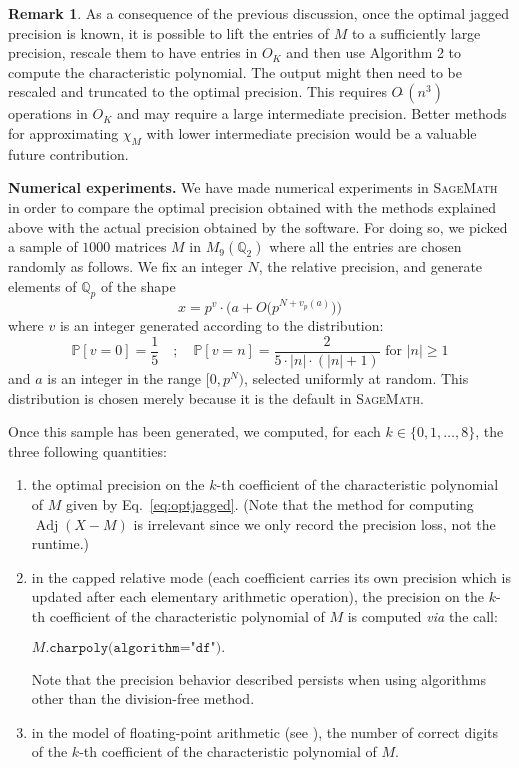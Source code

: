 \documentclass[sigconf]{acmart}
\DeclareMathOperator{\adj}{Adj}
\newcommand{\Q}{\mathbb Q}
\newcommand{\softO}{O\tilde{~}}
\theoremstyle{definition}
\newtheorem{rem}[theo]{Remark}
\begin{document}
\begin{rem} \label{rem:lift_for_optimal}
As a consequence of the previous discussion, once the optimal jagged 
precision is known, it is possible to lift the entries of $M$ to a sufficiently
large precision, rescale them to have entries in $O_K$
and then use Algorithm 2 to
compute the characteristic polynomial.
The output might then need to be rescaled and
 truncated to the optimal precision. 
This requires $\softO(n^3)$ operations in $O_K$ 
and may require a large intermediate precision.
Better methods for approximating $\chi_M$ with
lower intermediate precision would be a valuable
future contribution.
\end{rem}

\medskip

\noindent
{\bf Numerical experiments.}
We have made numerical experiments in \textsc{SageMath}~\cite{sage}
in order to compare the optimal precision obtained with the methods
explained above with the actual precision obtained by the software.
For doing so, we picked a sample of $1000$ matrices $M$ in 
$M_9(\Q_2)$ where all the entries are chosen randomly as follows.
We fix an integer $N$, the relative precision, and generate elements of $\Q_p$ of the shape
\[
x = p^v \cdot \big(a + O\big(p^{N+v_p(a)}\big)\big)
\]
where $v$ is an integer generated according to the distribution:
\[
\mathbb P [v = 0] = \frac 1 5 \quad ; \quad
\mathbb P [v = n] = \frac 2 {5\cdot |n| \cdot (|n|+1)} \text{ for }
|n| \geq 1
\]
and $a$ is an integer in the range $[0, p^N)$, selected uniformly at random.
This distribution is chosen merely because it is the default in \textsc{SageMath}.

Once this sample has been generated, we computed, for each $k \in \{0, 
1, \ldots, 8\}$, the three following quantities:


\begin{enumerate}[$\bullet$]
\renewcommand{\itemsep}{0pt}
\item the optimal precision on the $k$-th coefficient of the 
characteristic polynomial of $M$ given by Eq.~\eqref{eq:optjagged}.
(Note that the method for computing $\adj(X{-}M)$ is irrelevant
since we only record the precision loss, not the runtime.)
\item in the capped relative mode (each 
coefficient carries its own precision which is updated after each 
elementary arithmetic operation),
the precision on the $k$-th coefficient of the 
characteristic polynomial of $M$ is computed \emph{via} the call:

\smallskip

\hfill$M\texttt{.charpoly(algorithm="df")}.$\hfill\null

\smallskip

\noindent 
Note that the precision behavior described persists when using algorithms
other than the division-free method.

\item in the model of floating-point arithmetic (see 
\cite[\S 2.3]{caruso:17a}), the number of correct digits of the 
$k$-th coefficient of the characteristic polynomial of $M$.
\end{enumerate}
\end{document}
